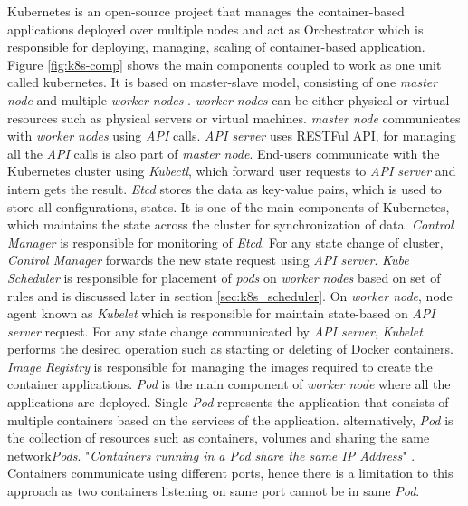 Kubernetes is an open-source project that manages the container-based applications deployed over multiple nodes and act as Orchestrator which is responsible for deploying, managing, scaling of container-based application\cite{k8s-git}. Figure \ref{fig:k8s-comp} shows the main components coupled to work as one unit called kubernetes. It is based on master-slave model, consisting of one \emph{master node} and multiple \emph{worker nodes} \cite{Santos2019}. \emph{worker nodes} can be either physical or virtual resources such as physical servers or virtual machines. \emph{master node} communicates with \emph{worker nodes} using \emph{API} calls\cite{Santos2019}. \emph{API server} uses RESTFul API, for managing all the \emph{API} calls is also part of \emph{master node}. End-users communicate with the Kubernetes cluster using \emph{Kubectl}, which forward user requests to \emph{API server} and intern gets the result. \emph{Etcd} stores the data as key-value pairs, which is used to store all configurations, states. It is one of the main components of Kubernetes, which maintains the state across the cluster for synchronization of data\cite{Santos2019}. \emph{Control Manager} is responsible for monitoring of \emph{Etcd}. For any state change of cluster, \emph{Control Manager} forwards the new state request using \emph{API server}\cite{Santos2019}. \emph{Kube Scheduler} is responsible for placement of \emph{pods} on \emph{worker nodes} based on set of rules and is discussed later in section \ref{sec:k8s_scheduler}. On \emph{worker node}, node agent known as \emph{Kubelet} which is responsible for maintain state-based on \emph{API server} request\cite{Santos2019}. For any state change communicated by \emph{API server}, \emph{Kubelet} performs the desired operation such as starting or deleting of Docker containers\cite{Santos2019}. \emph{Image Registry} is responsible for managing the images required to create the container applications. \emph{Pod} is the main component of \emph{worker node} where all the applications are deployed. Single \emph{Pod} represents the application that consists of multiple containers based on the services of the application. alternatively, \emph{Pod} is the collection of resources such as containers, volumes and sharing the same network\emph{Pods}\cite{Santos2019}. "\emph{Containers running in a Pod share the same IP Address}" \cite{Santos2019}. Containers communicate using different ports, hence there is a limitation to this approach as two containers listening on same port cannot be in same \emph{Pod}\cite{Santos2019}.
